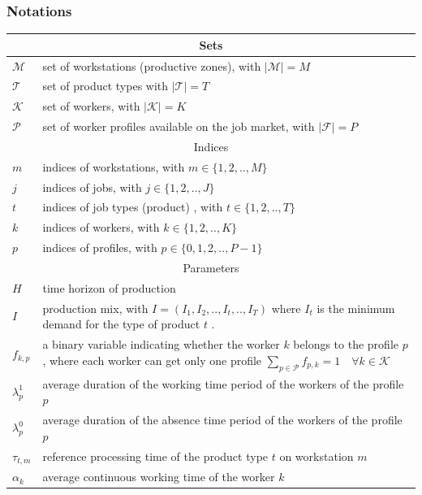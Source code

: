 \documentclass[review,12pt, 3p, times]{elsarticle}
\begin{document}
\subsubsection{Notations}
\begin{longtable}{p{} p{}}
    \hline
    \multicolumn{2}{c}{Sets }\\
    \hline
    $\mathcal{M}$ & set of workstations (productive zones), with $|\mathcal{M}|=M$                      \\
    $\mathcal{T}$ & set of  product types	with $|\mathcal{T}|=T$\\
    $\mathcal{K}$ & set of workers, with $|\mathcal{K}|=K$\\
    $\mathcal{P}$ & set of worker profiles available on the job market, with $|\mathcal{F}|=P$\\
    \hline
    \multicolumn{2}{c}{Indices }\\
    \hline
    $m$           & indices of workstations, with $m\in\{1,2,..,M\}$\\
    $j$           & indices of jobs, with $j\in\{1,2,..,J\}$\\
    $t$           & indices of job types (product) , with $t\in\{1,2,..,T\}$\\
    $k$           & indices of workers, with $k\in\{1,2,..,K\}$\\
    $p$           & indices of profiles, with $p\in\{0,1,2,..,P-1\}$\\
    \hline
    \multicolumn{2}{c}{Parameters}\\
    \hline
    $H$           & time horizon of production                                 \\
    $I$           & production mix, with $I=(I_1,I_2,..,I_t,..,I_T)$ where $I_t$ is the minimum demand for the type of product $t$ .\\
    $f_{k,p}$     & a binary variable indicating whether the worker $k$  belongs to the profile $p$, where each worker can get only one profile $\sum_{p\in\mathcal{P}} f_{p,k} =1  \quad\forall k\in\mathcal{K}$\\
    $\lambda^1_p$ & average duration of the working time period of the workers of the profile $p$\\
    $\lambda^0_p$ & average duration of the absence time period of the workers of the profile $p$\\
    $\tau_{t,m}$  & reference processing time of the product type $t$ on workstation $m$\\
    $\alpha_k$    & average continuous working time of the worker $k$\\

\end{longtable}
\end{document}
